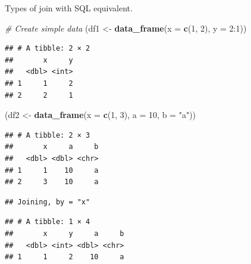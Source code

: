 \documentclass[]{book}
\newenvironment{Shaded}{\begin{snugshade}}{\end{snugshade}}
\newcommand{\KeywordTok}[1]{\textcolor[rgb]{0.13,0.29,0.53}{\textbf{{#1}}}}
\newcommand{\DataTypeTok}[1]{\textcolor[rgb]{0.13,0.29,0.53}{{#1}}}
\newcommand{\DecValTok}[1]{\textcolor[rgb]{0.00,0.00,0.81}{{#1}}}
\newcommand{\StringTok}[1]{\textcolor[rgb]{0.31,0.60,0.02}{{#1}}}
\newcommand{\CommentTok}[1]{\textcolor[rgb]{0.56,0.35,0.01}{\textit{{#1}}}}
\newcommand{\NormalTok}[1]{{#1}}
\theoremstyle{definition}
\theoremstyle{definition}
\theoremstyle{remark}
\begin{document}
Types of join with SQL equivalent.

\begin{Shaded}
\begin{Highlighting}[]
\CommentTok{# Create simple data}
\NormalTok{(df1 <-}\StringTok{ }\KeywordTok{data_frame}\NormalTok{(}\DataTypeTok{x =} \KeywordTok{c}\NormalTok{(}\DecValTok{1}\NormalTok{, }\DecValTok{2}\NormalTok{), }\DataTypeTok{y =} \DecValTok{2}\NormalTok{:}\DecValTok{1}\NormalTok{))}
\end{Highlighting}
\end{Shaded}

\begin{verbatim}
## # A tibble: 2 × 2
##       x     y
##   <dbl> <int>
## 1     1     2
## 2     2     1
\end{verbatim}

\begin{Shaded}
\begin{Highlighting}[]
\NormalTok{(df2 <-}\StringTok{ }\KeywordTok{data_frame}\NormalTok{(}\DataTypeTok{x =} \KeywordTok{c}\NormalTok{(}\DecValTok{1}\NormalTok{, }\DecValTok{3}\NormalTok{), }\DataTypeTok{a =} \DecValTok{10}\NormalTok{, }\DataTypeTok{b =} \StringTok{"a"}\NormalTok{))}
\end{Highlighting}
\end{Shaded}

\begin{verbatim}
## # A tibble: 2 × 3
##       x     a     b
##   <dbl> <dbl> <chr>
## 1     1    10     a
## 2     3    10     a
\end{verbatim}

\begin{Shaded}
\end{Shaded}

\begin{verbatim}
## Joining, by = "x"
\end{verbatim}

\begin{verbatim}
## # A tibble: 1 × 4
##       x     y     a     b
##   <dbl> <int> <dbl> <chr>
## 1     1     2    10     a
\end{verbatim}

\begin{Shaded}
\end{Shaded}
\end{document}
